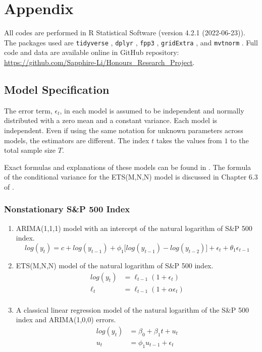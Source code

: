 \documentclass{monashthesis}
\begin{document}
\hypertarget{appendix}{%
\chapter{Appendix}\label{appendix}}

All codes are performed in R Statistical Software (version 4.2.1 (2022-06-23)). The packages used are \texttt{tidyverse} \autocite{tidy19}, \texttt{dplyr} \autocite{dplyr23}, \texttt{fpp3} \autocite{fpp23}, \texttt{gridExtra} \autocite{gridExtra}, and \texttt{mvtnorm} \autocite{GBMMLSH21}. Full code and data are available online in GitHub repository: \url{https://github.com/Sapphire-Li/Honours_Research_Project}.

\hypertarget{model-specification}{%
\section{Model Specification}\label{model-specification}}

The error term, \(\epsilon_t\), in each model is assumed to be independent and normally distributed with a zero mean and a constant variance. Each model is independent. Even if using the same notation for unknown parameters across models, the estimators are different. The index \(t\) takes the values from \(1\) to the total sample size \(T\).

Exact formulas and explanations of these models can be found in \textcite{fpp3}. The formula of the conditional variance for the ETS(M,N,N) model is discussed in Chapter 6.3 of \textcite{HKOS08}.

\hypertarget{nonstationary-sp-500-index}{%
\subsection{Nonstationary S\&P 500 Index}\label{nonstationary-sp-500-index}}

\begin{enumerate}
\def\labelenumi{\arabic{enumi}.}
\item
  ARIMA(1,1,1) model with an intercept of the natural logarithm of S\&P 500 index.
  \begin{equation*}
  log(y_t) = c + log(y_{t-1}) + \phi_1\big[log(y_{t-1})-log(y_{t-2})\big] + \epsilon_t + \theta_1\epsilon_{t-1}
  \end{equation*}
\item
  ETS(M,N,N) model of the natural logarithm of S\&P 500 index.
  \begin{align*}
  log(y_t) &= \ell_{t-1} (1+\epsilon_t) \\
  \ell_t &= \ell_{t-1} (1+\alpha \epsilon_t) \\
  \end{align*}
\item
  A classical linear regression model of the natural logarithm of the S\&P 500 index and ARIMA(1,0,0) errors.
  \begin{align*}
  log(y_t) &= \beta_0 + \beta_1 t + u_t \\
  u_t &= \phi_1 u_{t-1} + \epsilon_t
  \end{align*}
\end{enumerate}
\end{document}
